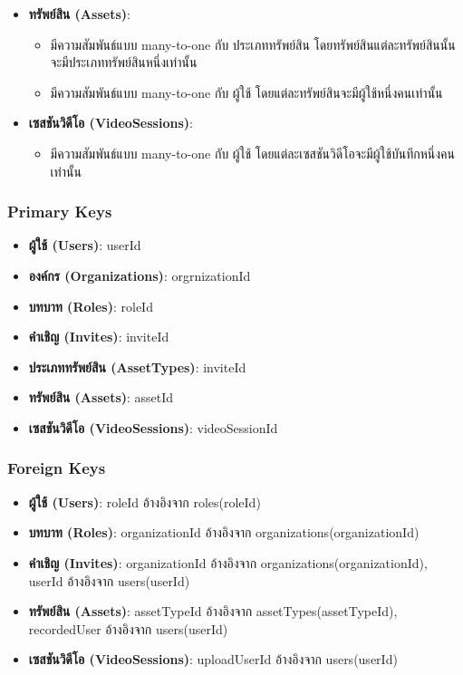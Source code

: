 \begin{itemize}
\begin{itemize}
        \end{itemize}
    \item \textbf{ทรัพย์สิน (Assets)}:
        \begin{itemize}
            \item มีความสัมพันธ์แบบ many-to-one กับ ประเภททรัพย์สิน โดยทรัพย์สินแต่ละทรัพย์สินนั้น จะมีประเภททรัพย์สินหนึ่งเท่านั้น
            \item มีความสัมพันธ์แบบ many-to-one กับ ผู้ใช้ โดยแต่ละทรัพย์สินจะมีผู้ใช้หนึ่งคนเท่านั้น
        \end{itemize}
    \item \textbf{เซสชันวิดีโอ (VideoSessions)}:
        \begin{itemize}
            \item มีความสัมพันธ์แบบ many-to-one กับ ผู้ใช้ โดยแต่ละเซสชันวิดีโอจะมีผู้ใช้บันทึกหนึ่งคนเท่านั้น
        \end{itemize}
\end{itemize}

\subsubsection{Primary Keys}
\begin{itemize}
    \item \textbf{ผู้ใช้ (Users)}: userId
    \item \textbf{องค์กร (Organizations)}: orgrnizationId
    \item \textbf{บทบาท (Roles)}: roleId
    \item \textbf{คำเชิญ (Invites)}: inviteId
    \item \textbf{ประเภททรัพย์สิน (AssetTypes)}: inviteId
    \item \textbf{ทรัพย์สิน (Assets)}: assetId
    \item \textbf{เซสชันวิดีโอ (VideoSessions)}: videoSessionId
\end{itemize}

\clearpage

\subsubsection{Foreign Keys}
\begin{itemize}
    \item \textbf{ผู้ใช้ (Users)}: roleId อ้างอิงจาก roles(roleId)
    \item \textbf{บทบาท (Roles)}: organizationId อ้างอิงจาก organizations(organizationId)
    \item \textbf{คำเชิญ (Invites)}: organizationId อ้างอิงจาก organizations(organizationId), userId อ้างอิงจาก users(userId)
    \item \textbf{ทรัพย์สิน (Assets)}: assetTypeId อ้างอิงจาก assetTypes(assetTypeId), recordedUser อ้างอิงจาก users(userId)
    \item \textbf{เซสชันวิดีโอ (VideoSessions)}: uploadUserId อ้างอิงจาก users(userId)
\end{itemize}

\fi